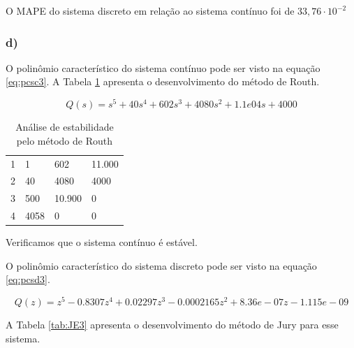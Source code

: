     O MAPE do sistema discreto em relação ao sistema contínuo foi de $33,76 \cdot 10^{-2}$

\subsubsection*{d)}


    O polinômio característico do sistema contínuo pode ser visto na equação \ref{eq:pcsc3}. A Tabela 
    \ref{tab:RE3} apresenta o desenvolvimento do método de Routh. 

    \begin{equation}
        Q(s) = s^5 + 40 s^4 + 602 s^3 + 4080 s^2 + 1.1e04 s + 4000
        \label{eq:pcsc3}
    \end{equation}

    \begin{table}[!ht]
        \centering
        \vspace{0.5cm}
        \caption{Análise de estabilidade pelo método de Routh} 
        \begin{tabular}{r|lll}
            1 & 1 & 602 & 11.000 \\
            2 & 40 & 4080 & 4000 \\
            3 & 500 & 10.900 & 0\\
            4 & 4058 & 0 & 0
        \end{tabular}                
        \label{tab:RE3}
    \end{table}

    Verificamos que o sistema contínuo é estável.

    O polinômio característico do sistema discreto pode ser visto na equação \ref{eq:pcsd3}.

    \begin{equation}
        Q(z) = z^5 - 0.8307 z^4 + 0.02297 z^3 - 0.0002165 z^2 + 8.36e-07 z  - 1.115e-09                                                         
        \label{eq:pcsd3}
    \end{equation}

    A Tabela \ref{tab:JE3} apresenta o desenvolvimento do método de Jury para esse sistema.

